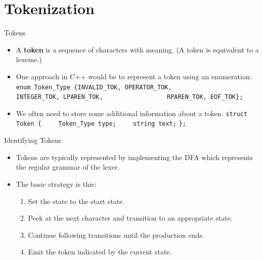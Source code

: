 \documentclass[]{beamer}
\begin{document}
\section{Tokenization}

\begin{frame}[fragile]{Tokens}
    \begin{itemize}[<+->]
        \item A \textbf{token} is a sequence of characters with
        meaning. (A token is equivalent to a lexeme.)
        \item One approach in C++ would be to represent a token using
            an enumeration:
            \newline\verb!enum Token_Type {INVALID_TOK, OPERATOR_TOK,!
            \newline\verb!                 INTEGER_TOK, LPAREN_TOK,!
            \newline\verb!                 RPAREN_TOK, EOF_TOK};!
        \item We often need to store some additional information about
            a token:
            \newline\verb!struct Token {!
            \newline\verb!    Token_Type type;!
            \newline\verb!    string text;!
            \newline\verb!};!
    \end{itemize}
\end{frame}

\begin{frame}{Identifying Tokens}
    \begin{itemize}[<+->]
        \item Tokens are typically represented by implementing the DFA
            which represents the regular grammar of the lexer.
        \item The basic strategy is this:
            \begin{enumerate}
                \item Set the state to the start state.
                \item Peek at the next character and transition to an
                    appropriate state.
                \item Continue following transitions until the
                    production ends.
                \item Emit the token indicated by the current state.
            \end{enumerate}
    \end{itemize}
\end{frame}
\end{document}

